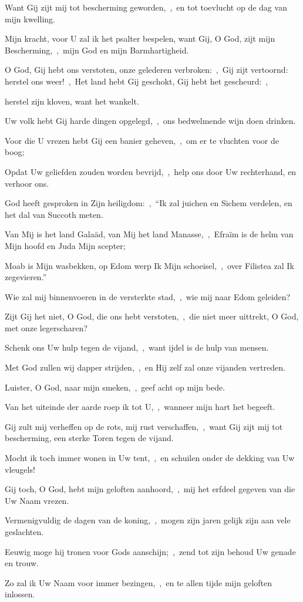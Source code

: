 \documentclass[12pt,twoside,a5paper]{article}
\begin{document}
\begin{halfparskip}
  Want Gij zijt mij tot bescherming geworden,~\sep\ en tot toevlucht op de dag van mijn kwelling.

  Mijn kracht, voor U zal ik het psalter bespelen, want Gij, O God, zijt mijn Bescherming,~\sep\ mijn God en mijn Barmhartigheid.

   O God, Gij hebt ons verstoten, onze gelederen verbroken:~\sep\ Gij zijt vertoornd: herstel ons weer!~\sep\ Het land hebt Gij geschokt, Gij hebt het gescheurd:~\sep

  herstel zijn kloven, want het wankelt.

  Uw volk hebt Gij harde dingen opgelegd,~\sep\ ons bedwelmende wijn doen drinken.

  Voor die U vrezen hebt Gij een banier geheven,~\sep\ om er te vluchten voor de boog;

  Opdat Uw geliefden zouden worden bevrijd,~\sep\ help ons door Uw rechterhand, en verhoor ons.

  God heeft gesproken in Zijn heiligdom:~\sep\ ``Ik zal juichen en Sichem verdelen, en het dal van Succoth meten.

  Van Mij is het land Galaäd, van Mij het land Manasse,~\sep\ Efraïm is de helm van Mijn hoofd en Juda Mijn scepter;

  Moab is Mijn wasbekken, op Edom werp Ik Mijn schoeisel,~\sep\ over Filistea zal Ik zegevieren.''

  Wie zal mij binnenvoeren in de versterkte stad,~\sep\ wie mij naar Edom geleiden?

  Zijt Gij het niet, O God, die ons hebt verstoten,~\sep\ die niet meer uittrekt, O God, met onze legerscharen?

  Schenk ons Uw hulp tegen de vijand,~\sep\ want ijdel is de hulp van mensen.

  Met God zullen wij dapper strijden,~\sep\ en Hij zelf zal onze vijanden vertreden.

   Luister, O God, naar mijn smeken,~\sep\ geef acht op mijn bede.

  Van het uiteinde der aarde roep ik tot U,~\sep\ wanneer mijn hart het begeeft.

  Gij zult mij verheffen op de rots, mij rust verschaffen,~\sep\ want Gij zijt mij tot bescherming, een sterke Toren tegen de vijand.

  Mocht ik toch immer wonen in Uw tent,~\sep\ en schuilen onder de dekking van Uw vleugels!

  Gij toch, O God, hebt mijn geloften aanhoord,~\sep\ mij het erfdeel gegeven van die Uw Naam vrezen.

  Vermenigvuldig de dagen van de koning,~\sep\ mogen zijn jaren gelijk zijn aan vele geslachten.

  Eeuwig moge hij tronen voor Gods aanschijn;~\sep\ zend tot zijn behoud Uw genade en trouw.

  Zo zal ik Uw Naam voor immer bezingen,~\sep\ en te allen tijde mijn geloften inlossen.
\end{halfparskip}
\end{document}
